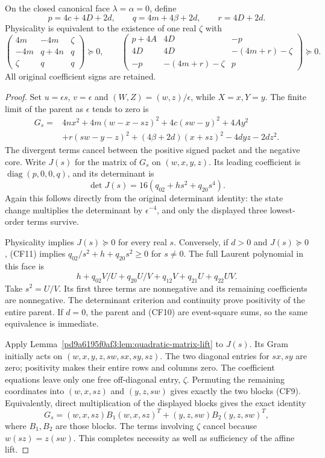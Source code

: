\begin{theorem}
\label{pd9a6195f0af3:thm:closed-face-opposite}
On the closed canonical face $\lambda=\alpha=0$, define
\[
 p=4c+4D+2d,\qquad q=4m+4\beta+2d,\qquad r=4D+2d.
\]
Physicality is equivalent to the existence of one real $\zeta$ with
\[
 \begin{pmatrix}
 4m&-4m&\zeta\\
 -4m&q+4n&q\\
 \zeta&q&q
 \end{pmatrix}\succeq0,\qquad
 \begin{pmatrix}
 p+4A&4D&-p\\
 4D&4D&-(4m+r)-\zeta\\
 -p&-(4m+r)-\zeta&p
 \end{pmatrix}\succeq0.                                  \tag{CF9}
\]
All original coefficient signs are retained.
\end{theorem}
\begin{proof}
Set $u=\epsilon s$, $v=\epsilon$ and
$(W,Z)=(w,z)/\epsilon$, while $X=x,Y=y$. The finite limit of
the parent as $\epsilon$ tends to zero is
\[
\begin{split}
G_s={}&4nx^2+4m(w-x-sz)^2+4c(sw-y)^2+4Ay^2\\
 &+r(sw-y-z)^2+(4\beta+2d)(x+sz)^2-4dyz-2dz^2.
\end{split}                                               \tag{CF10}
\]
The divergent terms cancel between the positive signed packet and
the negative core. Write $J(s)$ for the matrix of $G_s$ on
$(w,x,y,z)$. Its leading coefficient is
$\operatorname{diag}(p,0,0,q)$, and its determinant is
\[
 \det J(s)=16(q_{02}+hs^2+q_{20}s^4).                      \tag{CF11}
\]
Again this follows directly from the original determinant identity:
the state change multiplies the determinant by $\epsilon^{-4}$,
and only the displayed three lowest-order terms survive.

Physicality implies $J(s)\succeq0$ for every real $s$. Conversely,
if $d>0$ and $J(s)\succeq0$, (CF11) implies
$q_{02}/s^2+h+q_{20}s^2\ge0$ for $s\ne0$. The full Laurent
polynomial in this face is
\[
 h+q_{02}V/U+q_{20}U/V+q_{12}V+q_{21}U+q_{22}UV.
\]
Take $s^2=U/V$. Its first three terms are nonnegative and its
remaining coefficients are nonnegative. The determinant criterion
and continuity prove positivity of the entire parent. If $d=0$,
the parent and (CF10) are event-square sums, so the same equivalence
is immediate.

Apply Lemma~\ref{pd9a6195f0af3:lem:quadratic-matrix-lift} to $J(s)$. Its Gram
initially acts on $(w,x,y,z,sw,sx,sy,sz)$. The two diagonal entries
for $sx,sy$ are zero; positivity makes their entire rows and columns
zero. The coefficient equations leave only one free off-diagonal
entry, $\zeta$. Permuting the remaining coordinates into
$(w,x,sz)$ and $(y,z,sw)$ gives exactly the two blocks (CF9).
Equivalently, direct multiplication of the displayed blocks gives
the exact identity
\[
 G_s=(w,x,sz)B_1(w,x,sz)^T+(y,z,sw)B_2(y,z,sw)^T,
\]
where $B_1,B_2$ are those blocks. The terms involving $\zeta$
cancel because $w(sz)=z(sw)$. This completes necessity as well
as sufficiency of the affine lift.
\end{proof}


